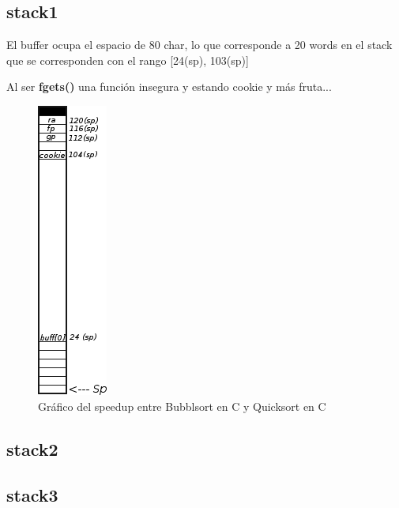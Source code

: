 \documentclass[a4paper,10pt]{article}
\begin{document}
\subsection{stack1}
\lstset{ language = C, numbers=left, tabsize=4, breaklines=true, frame=single }


\bigskip
El buffer ocupa el espacio de 80 char, lo que corresponde a 20 words en el stack que se corresponden con el rango [24(sp), 103(sp)]

Al ser \textbf{fgets()} una función insegura y estando cookie y más fruta...

\bigskip

\begin{figure}[h!]
	\centering
	\includegraphics[scale=0.7]{./recursos/stack1.png}
	\caption{Gr\'afico del speedup entre Bubblsort en C y Quicksort en C}
\end{figure}





\subsection{stack2}
\lstset{ language = C, numbers=left, tabsize=4, breaklines=true, frame=single }


\subsection{stack3}
\lstset{ language = C, numbers=left, tabsize=4, breaklines=true, frame=single }

\end{document}
